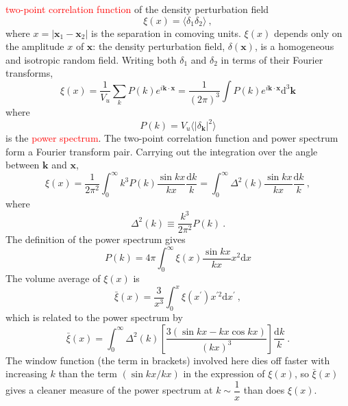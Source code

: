 \documentclass[12pt,a4paper]{article}
\renewcommand{\vec}[1]{\boldsymbol{#1}}
\newcommand{\dif}{\mathrm{d}}
\begin{document}
\textcolor{red}{two-point correlation function} of the density perturbation field
\begin{equation}
\xi(x) = \langle \delta_1 \delta_2\rangle ~,
\end{equation}
where $x = |\vec{x}_1 -\vec{x}_2|$ is the separation in comoving units. $\xi(x)$ depends only on the amplitude $x$ of $\vec{x}$: the density perturbation field, $\delta(\vec{x})$, is a homogeneous and isotropic random field. Writing both $\delta_1$ and $\delta_2$ in terms of their Fourier transforms, 
\begin{equation}
\xi(x) = \frac{1}{V_u} \sum_k P(k) e^{i\vec{k}\cdot \vec{x}} = \frac{1}{(2\pi)^3} \int P(k) e^{i\vec{k}\cdot \vec{x}} \dif^3 \vec{k} 
\end{equation}
where
\begin{equation}
P(k) = V_u \langle |\delta_{\vec{k}}|^2 \rangle
\end{equation}
is the \textcolor{red}{power spectrum}. The two-point correlation function and power spectrum form a Fourier transform pair. Carrying out the integration over the angle between $\vec{k}$ and $\vec{x}$, 
\begin{equation}
\xi(x) = \frac{1}{2\pi^2} \int_0^\infty k^3 P(k) \frac{\sin kx}{kx} \frac{\dif k}{k} = \int_0^\infty \Delta^2(k) \frac{\sin kx}{kx} \frac{\dif k}{k} ~,
\end{equation}
where
\begin{equation}
\Delta^2(k) \equiv \frac{k^3}{2\pi^2} P(k) ~.
\end{equation}
The definition of the power spectrum gives
\begin{equation}
P(k) = 4\pi \int_0^\infty \xi(x) \frac{\sin kx}{kx} x^2 {\dif x}
\end{equation}
The volume average of $\xi(x)$ is 
\begin{equation}
\bar{\xi}(x) = \frac{3}{x^3} \int_0^x \xi(x^\prime) x^{\prime 2} \dif x^\prime ~,
\end{equation}
which is related to the power spectrum by
\begin{equation}
\bar{\xi}(x) = \int_0^\infty \Delta^2(k) \left[\frac{3(\sin kx -kx \cos kx)}{(kx)^3} \right] \frac{\dif k}{k} ~.
\end{equation}
The window function (the term in brackets) involved here dies off faster with increasing $k$ than the term $(\sin kx/kx)$ in the expression of $\xi(x)$, so $\bar{\xi}(x)$ gives a cleaner measure of the power spectrum at $k \sim \dfrac{1}{x}$ than does $\xi(x)$.
\end{document}

